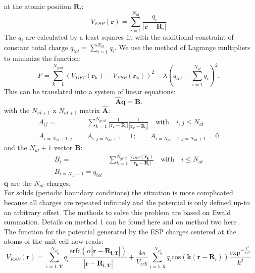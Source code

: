 at the atomic position $\mathbf{R}_i$:
\begin{equation}
 V_{ESP}(\mathbf{r})=\sum_{i=1}^{N_{at}}\frac{q_i}{|\mathbf{r}-\mathbf{R}_i|}
\end{equation}
The $q_i$ are calculated by a least squares fit with the additional constraint of constant total charge $q_{tot}=\sum_{i=1}^{N_{at}} q_i$. 
We use the method of Lagrange multipliers to minimize the function:
\begin{equation}
 F=\sum_{k=1}^{N_{grid}}\left(V_{DFT}(\mathbf{r_k})-V_{ESP}(\mathbf{r_k})\right)^2-\lambda\left(q_{tot}-\sum_{i=1}^{N_{at}}q_i\right)^2.\label{F_esp}
\end{equation}
This can be translated into a system of linear equations:
\begin{equation}
 \mathbf{\hat{A}}\mathbf{q}=\mathbf{B}.
\end{equation}
with the $N_{at+1}$ x $N_{at+1}$ matrix $\mathbf{\hat{A}}$:
\begin{align}
A_{ij}=&\sum_{k=1}^{N_{grid}}\frac{1}{|\mathbf{r_k}-\mathbf{R}_i|}\frac{1}{|\mathbf{r_k}-\mathbf{R}_j|}\quad \mathrm{with}\quad i,j\leq N_{at}\\
A_{i=N_{at}+1,j}=&A_{i,j=N_{at}+1}=1;\qquad A_{i=N_{at}+1,j=N_{at}+1}=0\nonumber
\end{align}
and the $N_{at}+1$ vector $\mathbf{B}$:
\begin{align}
 B_i=&\sum_{k=1}^{N_{grid}}\frac{V_{DFT}(\mathbf{r_k})}{|\mathbf{r_k}-\mathbf{R}_i|}\quad \mathrm{with}\quad i\leq N_{at}\\
 B_{i=N_{at}+1}=q_{tot}
\end{align}
$\mathbf{q}$ are the $N_{at}$ charges.\\
For solids (periodic boundary conditions) the situation is more complicated because all charges are repeated infinitely and the 
potential is only defined up-to an arbitrary offset. The methods to solve this problem are based on Ewald summation. 
Details on method 1 can be found here \cite{Campana2009} and on method two here \cite{Chen2010}. The function for the potential 
generated by the ESP charges centered at the atoms of the unit-cell now reads:
\begin{equation}
 V_{ESP}(\mathbf{r})=\sum_{i=1,\mathbf{T}}^{N_{at}}q_i\frac{\mathrm{erfc}(\alpha|\mathbf{r}-\mathbf{R_{i,\mathbf{T}}}|)}{|\mathbf{r}-\mathbf{R_{i,\mathbf{T}}}|}+\frac{4\pi}{V_{cell}}\sum_{i=1,\mathbf{k}}^{N_{at}}q_i\mathrm{cos}(\mathbf{k}(\mathbf{r}-\mathbf{R}_{i}))\frac{\mathrm{exp}^{-\frac{k^2}{4\alpha^2}}}{k^2}\label{V_Ewald}
\end{equation}
